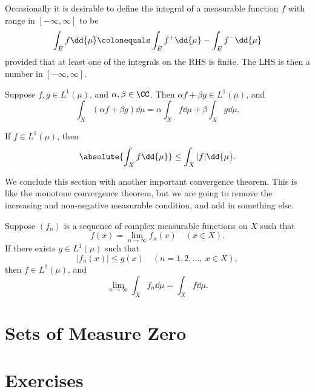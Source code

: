 Occasionally it is desirable to define the integral of a measurable function $f$ with range in $[-\infty,\infty]$ to be
\[\int_{E}f\dd{\mu}\colonequals\int_{E}f^+\dd{\mu}-\int_{E}f^-\dd{\mu}\]
provided that at least one of the integrals on the RHS is finite. The LHS is then a number in $[-\infty,\infty]$.

\begin{lemma}[Linearity]
Suppose $f,g\in L^1(\mu)$, and $\alpha,\beta\in\CC$. Then $\alpha f+\beta g\in L^1(\mu)$, and
\[\int_{X}(\alpha f+\beta g)\dd{\mu}=\alpha\int_{X}f\dd{\mu}+\beta\int_{X}g\dd{\mu}.\]
\end{lemma}

\begin{lemma}
If $f\in L^1(\mu)$, then
\[\absolute{\int_{X}f\dd{\mu}}\le\int_{X}|f|\dd{\mu}.\]
\end{lemma}

We conclude this section with another important convergence theorem. 
This is like the monotone convergence theorem, but we are going to remove the increasing and non-negative measurable condition, and add in something else.

\begin{theorem}
Suppose $(f_n)$ is a sequence of complex measurable functions on $X$ such that
\[f(x)=\lim_{n\to\infty}f_n(x)\quad(x\in X).\]
If there exists $g\in L^1(\mu)$ such that
\[|f_n(x)|\le g(x)\quad(n=1,2,\dots,\:x\in X),\]
then $f\in L^1(\mu)$, and
\begin{equation}
\lim_{n\to\infty}\int_{X}f_n\dd{\mu}=\int_{X}f\dd{\mu}.
\end{equation}
\end{theorem}
\pagebreak

\section{Sets of Measure Zero}

\pagebreak

\section*{Exercises}
